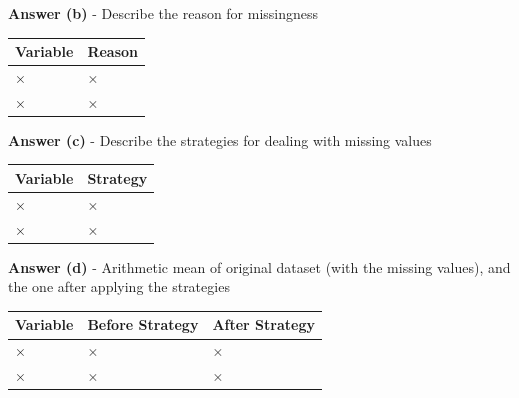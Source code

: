 \documentclass[a4paper,10pt]{article}\setlength{\textheight}{10in}\setlength{\textwidth}{6.5in}\setlength{\topmargin}{-0.125in}\setlength{\oddsidemargin}{-.2in}\setlength{\evensidemargin}{-.2in}\setlength{\headsep}{0.2in}\setlength{\footskip}{0pt}\usepackage{amsmath}\usepackage{fancyhdr}\usepackage{enumitem}\usepackage{hyperref}\usepackage{xcolor}\usepackage{graphicx}\usepackage[export]{adjustbox}\usepackage{caption}\usepackage{float}\usepackage{booktabs}\pagestyle{fancy}
\begin{document}
\begin{enumerate}[topsep=0mm, partopsep=0mm, leftmargin=*]
\textbf{Answer (b)} - Describe the reason for missingness
\begin{center}
\begin{tabular}{ll}
\toprule
\textbf{Variable} & \textbf{Reason} \\ \midrule
× & × \\
× & × \\
\bottomrule
\end{tabular}
\end{center}

\textbf{Answer (c)} - Describe the strategies for dealing with missing values
\begin{center}
\begin{tabular}{ll}
\toprule
\textbf{Variable} & \textbf{Strategy} \\ \midrule
× & × \\
× & × \\
\bottomrule
\end{tabular}
\end{center}

\textbf{Answer (d)} - Arithmetic mean of original dataset (with the missing values), and the one after applying the strategies
\begin{center}
\begin{tabular}{lll}
\toprule
\textbf{Variable} & \textbf{Before Strategy} & \textbf{After Strategy} \\ \midrule
× & × & × \\
× & × & × \\
\bottomrule
\end{tabular}
\end{center}

\end{enumerate}
\end{document}
